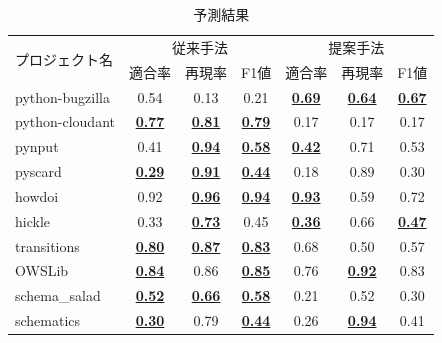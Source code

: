 \documentclass[T,J]{fose} %
\begin{document}
\begin{table}[t]
    \centering
    \caption{予測結果}
    \label{PrevPrediction}
    \begin{tabular}{l|ccc|ccc}
         \hline
         \multirow{2}{*}{プロジェクト名}&\multicolumn{3}{c|}{\multirow{1}{*}{従来手法}} & \multicolumn{3}{c}{提案手法}\\
          \cline{2-7}
          & 適合率 & 再現率 & F1値 & 適合率 & 再現率 & F1値\\ \hline
         \hline %
            python-bugzilla & 0.54 & 0.13 & 0.21 & \textbf{\underline{0.69}} & \textbf{\underline{0.64}} & \textbf{\underline{0.67}}\\
            python-cloudant & \textbf{\underline{0.77}} & \textbf{\underline{0.81}} & \textbf{\underline{0.79}} & 0.17 & 0.17 & 0.17\\
            pynput & 0.41 & \textbf{\underline{0.94}} & \textbf{\underline{0.58}} & \textbf{\underline{0.42}} & 0.71 & 0.53\\
            pyscard & \textbf{\underline{0.29}} & \textbf{\underline{0.91}} & \textbf{\underline{0.44}} & 0.18 & 0.89 & 0.30\\
            howdoi & 0.92 & \textbf{\underline{0.96}} & \textbf{\underline{0.94}} & \textbf{\underline{0.93}} & 0.59 & 0.72\\
            hickle & 0.33 & \textbf{\underline{0.73}} & 0.45 & \textbf{\underline{0.36}} & 0.66 & \textbf{\underline{0.47}}\\
            transitions & \textbf{\underline{0.80}} & \textbf{\underline{0.87}} & \textbf{\underline{0.83}} & 0.68 & 0.50 & 0.57\\
            OWSLib & \textbf{\underline{0.84}} & 0.86 & \textbf{\underline{0.85}} & 0.76 & \textbf{\underline{0.92}} & 0.83\\
            schema\_salad & \textbf{\underline{0.52}} & \textbf{\underline{0.66}} & \textbf{\underline{0.58}} & 0.21 & 0.52 & 0.30\\
            schematics & \textbf{\underline{0.30}} & 0.79 & \textbf{\underline{0.44}} & 0.26 & \textbf{\underline{0.94}} & 0.41\\
    \hline
    \end{tabular}
\end{table}


\end{document}
